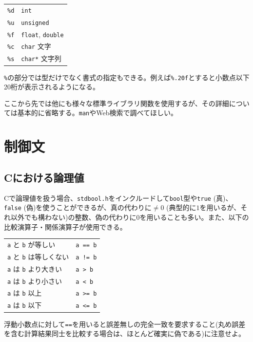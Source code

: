 \begin{table}[H]
    \centering
    \begin{tabular}{ll}
        \texttt{\%d}  & \texttt{int}          \\
        \texttt{\%u}  & \texttt{unsigned}     \\
        \texttt{\%f}  & \texttt{float}, \texttt{double} \\
        \texttt{\%c}  & \texttt{char} 文字    \\
        \texttt{\%s}  & \texttt{char*} 文字列
    \end{tabular}
\end{table}
\texttt{\%}の部分では型だけでなく書式の指定もできる。例えば\texttt{\%.20f}とすると小数点以下20桁が表示されるようになる。

ここから先では他にも様々な標準ライブラリ関数を使用するが、その詳細については基本的に省略する。\texttt{man}やWeb検索で調べてほしい。

\section{制御文}
\subsection{Cにおける論理値}
Cで論理値を扱う場合、\texttt{stdbool.h}をインクルードして\texttt{bool}型や\texttt{true} (真)、\texttt{false} (偽)を使うことができるが、真の代わりに\(\neq 0\) (典型的に\(1\)を用いるが、それ以外でも構わない)の整数、偽の代わりに\(0\)を用いることも多い。また、以下の比較演算子・関係演算子が使用できる。
\begin{table}[H]
    \centering
    \begin{tabular}{ll}
        \texttt{a} と \texttt{b} が等しい     & \texttt{a == b} \\
        \texttt{a} と \texttt{b} は等しくない & \texttt{a != b} \\
        \texttt{a} は \texttt{b} より大きい   & \texttt{a > b}  \\
        \texttt{a} は \texttt{b} より小さい   & \texttt{a < b}  \\
        \texttt{a} は \texttt{b} 以上         & \texttt{a >= b} \\
        \texttt{a} は \texttt{b} 以下         & \texttt{a <= b}
    \end{tabular}
\end{table} \noindent
浮動小数点に対して\texttt{==}を用いると誤差無しの完全一致を要求すること(丸め誤差を含む計算結果同士を比較する場合は、ほとんど確実に偽である)に注意せよ。

